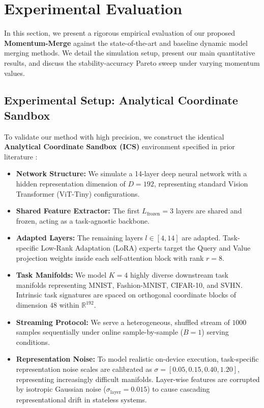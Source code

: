 \section{Experimental Evaluation}
\label{sec:experiments}

In this section, we present a rigorous empirical evaluation of our proposed \textbf{Momentum-Merge} against the state-of-the-art and baseline dynamic model merging methods. We detail the simulation setup, present our main quantitative results, and discuss the stability-accuracy Pareto sweep under varying momentum values.

\subsection{Experimental Setup: Analytical Coordinate Sandbox}
To validate our method with high precision, we construct the identical \textbf{Analytical Coordinate Sandbox (ICS)} environment specified in prior literature \cite{chemmerge, qsps}:
\begin{itemize}
    \item \textbf{Network Structure:} We simulate a 14-layer deep neural network with a hidden representation dimension of $D = 192$, representing standard Vision Transformer (ViT-Tiny) configurations.
    \item \textbf{Shared Feature Extractor:} The first $L_{\text{frozen}} = 3$ layers are shared and frozen, acting as a task-agnostic backbone.
    \item \textbf{Adapted Layers:} The remaining layers $l \in [4, 14]$ are adapted. Task-specific Low-Rank Adaptation (LoRA) experts target the Query and Value projection weights inside each self-attention block with rank $r = 8$.
    \item \textbf{Task Manifolds:} We model $K = 4$ highly diverse downstream task manifolds representing MNIST, Fashion-MNIST, CIFAR-10, and SVHN. Intrinsic task signatures are spaced on orthogonal coordinate blocks of dimension $48$ within $\mathbb{R}^{192}$.
    \item \textbf{Streaming Protocol:} We serve a heterogeneous, shuffled stream of $1000$ samples sequentially under online sample-by-sample ($B = 1$) serving conditions.
    \item \textbf{Representation Noise:} To model realistic on-device execution, task-specific representation noise scales are calibrated as $\sigma = [0.05, 0.15, 0.40, 1.20]$, representing increasingly difficult manifolds. Layer-wise features are corrupted by isotropic Gaussian noise ($\sigma_{\text{layer}} = 0.015$) to cause cascading representational drift in stateless systems.
\end{itemize}

